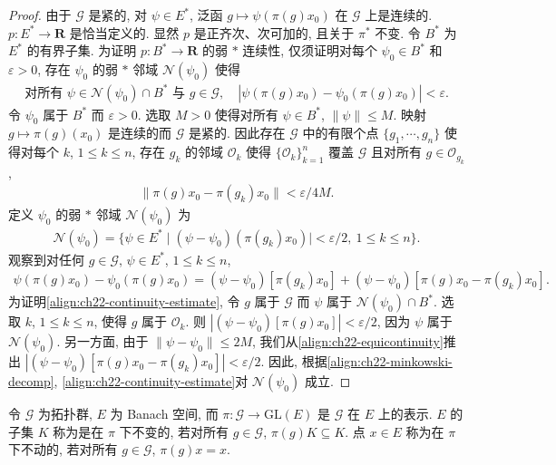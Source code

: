 \documentclass[../../main.tex]{subfiles}
\begin{document}
\begin{proof}
由于 $\mathcal{G}$ 是紧的, 对 $\psi\in E^{*}$, 泛函 $g\mapsto\psi(\pi(g)x_{0})$ 在 $\mathcal{G}$ 上是连续的. $p:E^{*}\to\mathbf{R}$ 是恰当定义的. 显然 $p$ 是正齐次、次可加的, 且关于 $\pi^{*}$ 不变. 令 $B^{*}$ 为 $E^{*}$ 的有界子集. 为证明 $p:B^{*}\to\mathbf{R}$ 的弱 $*$ 连续性, 仅须证明对每个 $\psi_{0}\in B^{*}$ 和 $\varepsilon>0$, 存在 $\psi_{0}$ 的弱 $*$ 邻域 $\mathcal{N}(\psi_{0})$ 使得
\begin{align}
\text{对所有 }\psi\in\mathcal{N}(\psi_{0})\cap B^{*}\text{ 与 }g\in\mathcal{G},\quad|\psi(\pi(g)x_{0})-\psi_{0}(\pi(g)x_{0})|<\varepsilon.
\label{align:ch22-continuity-estimate}
\end{align}
令 $\psi_{0}$ 属于 $B^{*}$ 而 $\varepsilon>0$. 选取 $M>0$ 使得对所有 $\psi\in B^{*}$, $\|\psi\|\leqslant M$. 映射 $g\mapsto\pi(g)(x_{0})$ 是连续的而 $\mathcal{G}$ 是紧的. 因此存在 $\mathcal{G}$ 中的有限个点 $\{g_{1},\cdots,g_{n}\}$ 使得对每个 $k$, $1\leqslant k\leqslant n$, 存在 $g_{k}$ 的邻域 $\mathcal{O}_{k}$ 使得 $\{\mathcal{O}_{k}\}_{k=1}^{n}$ 覆盖 $\mathcal{G}$ 且对所有 $g\in\mathcal{O}_{g_{k}}$,
\begin{align}
\|\pi(g)x_{0}-\pi(g_{k})x_{0}\|<\varepsilon/4M.
\label{align:ch22-equicontinuity}
\end{align}
定义 $\psi_{0}$ 的弱 $*$ 邻域 $\mathcal{N}(\psi_{0})$ 为
\begin{align*}
\mathcal{N}(\psi_{0})=\{\psi\in E^{*}\mid(\psi-\psi_{0})(\pi(g_{k})x_{0})|<\varepsilon/2,\ 1\leqslant k\leqslant n\}.
\end{align*}
观察到对任何 $g\in\mathcal{G}$, $\psi\in E^{*}$, $1\leqslant k\leqslant n$,
\begin{align}
\psi(\pi(g)x_{0})-\psi_{0}(\pi(g)x_{0})=(\psi-\psi_{0})[\pi(g_{k})x_{0}]+(\psi-\psi_{0})[\pi(g)x_{0}-\pi(g_{k})x_{0}].
\label{align:ch22-minkowski-decomp}
\end{align}
为证明\eqref{align:ch22-continuity-estimate}, 令 $g$ 属于 $\mathcal{G}$ 而 $\psi$ 属于 $\mathcal{N}(\psi_{0})\cap B^{*}$. 选取 $k$, $1\leqslant k\leqslant n$, 使得 $g$ 属于 $\mathcal{O}_{k}$. 则 $|(\psi-\psi_{0})[\pi(g)x_{0}]|<\varepsilon/2$, 因为 $\psi$ 属于 $\mathcal{N}(\psi_{0})$. 另一方面, 由于 $\|\psi-\psi_{0}\|\leqslant 2M$, 我们从\eqref{align:ch22-equicontinuity}推出 $|(\psi-\psi_{0})[\pi(g)x_{0}-\pi(g_{k})x_{0}]|<\varepsilon/2$. 因此, 根据\eqref{align:ch22-minkowski-decomp}, \eqref{align:ch22-continuity-estimate}对 $\mathcal{N}(\psi_{0})$ 成立.
\end{proof}

\begin{definition}[不变集与不动点]\label{definition:ch22-invariant-set}
令 $\mathcal{G}$ 为拓扑群, $E$ 为 Banach 空间, 而 $\pi:\mathcal{G}\to\mathrm{GL}(E)$ 是 $\mathcal{G}$ 在 $E$ 上的表示. $E$ 的子集 $K$ 称为是在 $\pi$ 下不变的, 若对所有 $g\in\mathcal{G}$, $\pi(g)K\subseteq K$. 点 $x\in E$ 称为在 $\pi$ 下不动的, 若对所有 $g\in\mathcal{G}$, $\pi(g)x=x$.
\end{definition}
\end{document}
